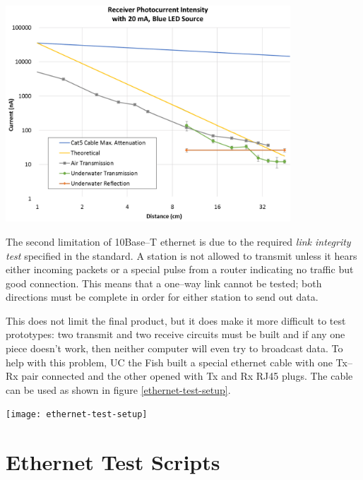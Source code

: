 \documentclass{article}
\begin{document}
\begin{center}
	\includegraphics[width=0.8\textwidth]{crossover-point.pdf}
	\label{crossover-point}
\end{center}

The second limitation of 10Base--T ethernet is due to the required \textit{link integrity test}
specified in the standard.
A station is not allowed to transmit unless it hears either incoming packets or
a special pulse from a router indicating no traffic but good connection.
This means that a one--way link cannot be tested; both directions must be complete
in order for either station to send out data.

This does not limit the final product, but it does make it more difficult to test
prototypes: two transmit and two receive circuits must be built and if
any one piece doesn't work, then neither computer will even try to broadcast data.
To help with this problem, UC the Fish built a special ethernet cable with
one Tx--Rx pair connected and the other opened with Tx and Rx RJ45 plugs.
The cable can be used as shown in figure \ref{ethernet-test-setup}.

\begin{center}
	\texttt{[image: ethernet-test-setup]}
	\label{ethernet-test-setup}
\end{center}

\appendix

\pagebreak
\section{Ethernet Test Scripts}



\pagebreak


\pagebreak

\end{document}
